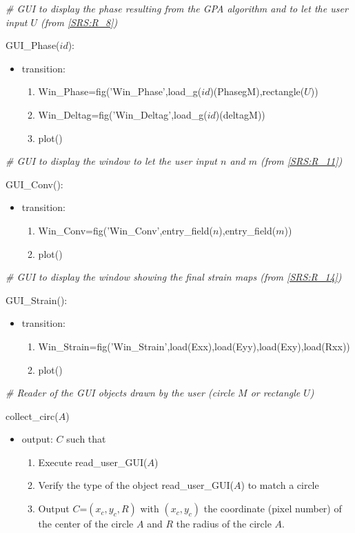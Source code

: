 \documentclass[12pt, titlepage]{article}
\begin{document}
\noindent\textit{{\#} GUI to display the phase resulting from the GPA algorithm and to let the user input $U$ (from \cref{SRS:R_8})}\medskip

\noindent GUI{\_}Phase($id$):
\begin{itemize}
\item transition: 
	\begin{enumerate}
	\item Win{\_}Phase=fig('Win{\_}Phase',load{\_}g($id$)(PhasegM),rectangle($U$))
	\item Win{\_}Deltag=fig('Win{\_}Deltag',load{\_}g($id$)(deltagM))
	\item plot()
	\end{enumerate} 
\end{itemize}
\bigskip

\noindent\textit{{\#} GUI to display the window to let the user input $n$ and $m$ (from \cref{SRS:R_11})}\medskip

\noindent GUI{\_}Conv():
\begin{itemize}
\item transition: 
	\begin{enumerate}
	\item Win{\_}Conv=fig('Win{\_}Conv',entry{\_}field($n$),entry{\_}field($m$))
	\item plot()
	\end{enumerate} 
\end{itemize}
\bigskip

\noindent\textit{{\#} GUI to display the window showing the final strain maps (from \cref{SRS:R_14})}\medskip

\noindent GUI{\_}Strain():
\begin{itemize}
\item transition: 
	\begin{enumerate}
	\item Win{\_}Strain=fig('Win{\_}Strain',load(Exx),load(Eyy),load(Exy),load(Rxx))
	\item plot()
	\end{enumerate} 
\end{itemize}
\bigskip


\noindent\textit{{\#} Reader of the GUI objects drawn by the user (circle $M$ or rectangle $U$)} \medskip

\noindent collect{\_}circ($A$)
\begin{itemize}
\item output: $C$ such that
	\begin{enumerate}
	\item Execute read{\_}user{\_}GUI($A$)
	\item Verify the type of the object read{\_}user{\_}GUI($A$) to match a circle
	\item Output $C$=$(x_c,y_c,R)$ with $(x_c,y_c)$ the coordinate (pixel number) of the center of the circle $A$ and $R$ the radius of the circle $A$.
	\end{enumerate} 
\end{itemize}
\bigskip
\end{document}
